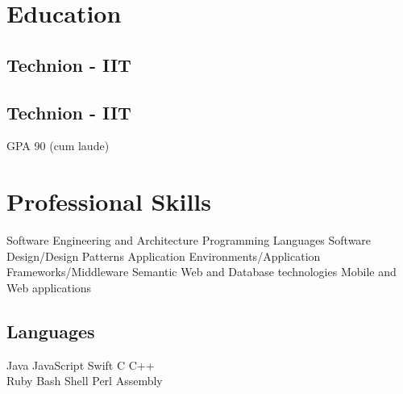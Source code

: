 \documentclass[]{deedy-resume}
\begin{document}
%
%

%
%



%
%

\begin{minipage}[t]{0.33\textwidth}


\section{Education}

\subsection{Technion - IIT}
\sectionsep
\subsection{Technion - IIT}
GPA 90 (cum laude)
\sectionsep


\section{Professional Skills}
Software Engineering and Architecture \textbullet{} Programming Languages \textbullet{} Software Design/Design Patterns \textbullet{} Application Environments/Application Frameworks/Middleware \textbullet{} Semantic Web and Database technologies \textbullet{} Mobile and Web applications
\sectionsep

\subsection{Languages}
Java \textbullet{} JavaScript \textbullet{} Swift \textbullet{} C \textbullet{}  C++ \\
Ruby  \textbullet{}  Bash Shell \textbullet{}  Perl \textbullet{} Assembly
\sectionsep


\end{minipage}
\end{document}
